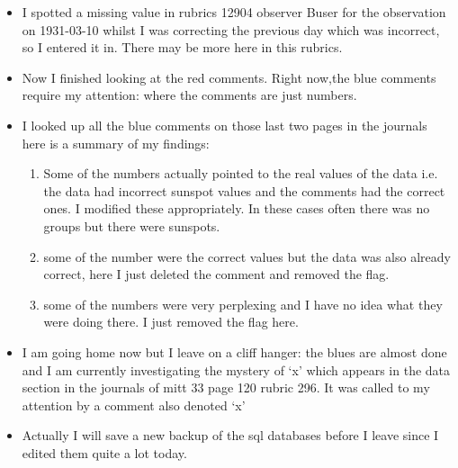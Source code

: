 \documentclass[12pt]{article}
\begin{document}
\begin{itemize}
\begin{enumerate}
    \end{enumerate}
    \item I spotted a missing value in rubrics 12904 observer Buser for the observation on 1931-03-10 whilst I was correcting the previous day which was incorrect, so I entered it in. There may be more here in this rubrics.
    \item Now I finished looking at the red comments. Right now,the blue comments require my attention: where the comments are just numbers.
    \item I looked up all the blue comments on those last two pages in the journals here is a summary of my findings:
    \begin{enumerate}
        \item Some of the numbers actually pointed to the real values of the data i.e. the data had incorrect sunspot values and the comments had the correct ones. I modified these appropriately. In these cases often there was no groups but there were sunspots.
        \item some of the number were the correct values but the data was also already correct, here I just deleted the comment and removed the flag.
        \item some of the numbers were very perplexing and I have no idea what they were doing there. I just removed the flag here.
    \end{enumerate}
    \item I am going home now but I leave on a cliff hanger: the blues are almost done and I am currently investigating the mystery of `x' which appears in the data section in the journals of mitt 33 page 120 rubric 296. It was called to my attention by a comment also denoted `x'
    \item Actually I will save a new backup of the sql databases before I leave since I edited them quite a lot today.
    \end{itemize}
            
\end{document}
